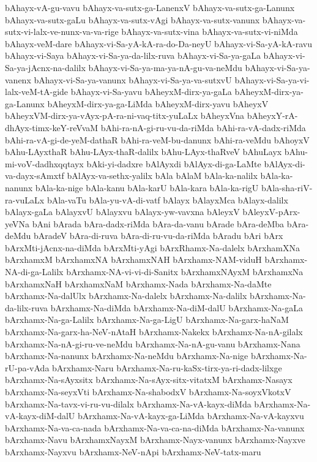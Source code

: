 {bAhayx-vA-gu-vavu
bAhayx-va-sutx-ga-LanenxV
bAhayx-va-sutx-ga-Lanunx
bAhayx-va-sutx-gaLu
bAhayx-va-sutx-vAgi
bAhayx-va-sutx-vanunx
bAhayx-va-sutx-vi-lalx-ve-nunx-va-va-rige
bAhayx-va-sutx-vina
bAhayx-va-sutx-vi-niMda
bAhayx-veM-dare
bAhayx-vi-Sa-yA-kA-ra-do-Da-neyU
bAhayx-vi-Sa-yA-kA-ravu
bAhayx-vi-Saya
bAhayx-vi-Sa-ya-da-lilx-ruva
bAhayx-vi-Sa-ya-gaLa
bAhayx-vi-Sa-ya-jAcnx-na-dalilx
bAhayx-vi-Sa-ya-ma-ya-nA-gu-va-neMdu
bAhayx-vi-Sa-ya-vanenx
bAhayx-vi-Sa-ya-vanunx
bAhayx-vi-Sa-ya-va-sutxvU
bAhayx-vi-Sa-ya-vi-lalx-veM-tA-gide
bAhayx-vi-Sa-yavu
bAheyxM-dirx-ya-gaLa
bAheyxM-dirx-ya-ga-Lanunx
bAheyxM-dirx-ya-ga-LiMda
bAheyxM-dirx-yavu
bAheyxV
bAheyxVM-dirx-ya-vAyx-pA-ra-ni-vaq-titx-yuLaLx
bAheyxVna
bAheyxY-rA-dhAyx-timx-keY-reVvaM
bAhi-ra-nA-gi-ru-vu-da-riMda
bAhi-ra-vA-dadx-riMda
bAhi-ra-vA-gi-de-yeM-dathaR
bAhi-ra-veM-bu-danunx
bAhi-ra-veMdu
bAhoyxV
bAhu-LAyxthaR
bAhu-LAyx-thaR-dalilx
bAhu-LAyx-thaRveV
bAhuLayx
bAhu-mi-voV-dadhxqqtayx
bAki-yi-dadxre
bAlAyxdi
bAlAyx-di-ga-LaMte
bAlAyx-di-va-dayx-sAmxtf
bAlAyx-va-sethx-yalilx
bAla
bAlaM
bAla-ka-nalilx
bAla-ka-nanunx
bAla-ka-nige
bAla-kanu
bAla-karU
bAla-kara
bAla-ka-rigU
bAla-sha-riV-ra-vuLaLx
bAla-vaTu
bAla-yu-vA-di-vatf
bAlayx
bAlayxMca
bAlayx-dalilx
bAlayx-gaLa
bAlayxvU
bAlayxvu
bAlayx-yw-vavxna
bAleyxV
bAleyxV-pArx-yeVNa
bAni
bArada
bAra-dadx-riMda
bAra-da-vanu
bArade
bAra-deMba
bAra-deMdu
bAradeV
bAra-di-ruva
bAra-di-ru-vu-da-riMda
bAradu
bAri
bArx
bArxMti-jAcnx-na-diMda
bArxMti-yAgi
bArxRhamx-Na-dalelx
bArxhamXNa
bArxhamxM
bArxhamxNA
bArxhamxNAH
bArxhamx-NAM-viduH
bArxhamx-NA-di-ga-Lalilx
bArxhamx-NA-vi-vi-di-Sanitx
bArxhamxNAyxM
bArxhamxNa
bArxhamxNaH
bArxhamxNaM
bArxhamx-Nada
bArxhamx-Na-daMte
bArxhamx-Na-dalUlx
bArxhamx-Na-dalelx
bArxhamx-Na-dalilx
bArxhamx-Na-da-lilx-ruva
bArxhamx-Na-diMda
bArxhamx-Na-diM-dalU
bArxhamx-Na-gaLa
bArxhamx-Na-ga-Lalilx
bArxhamx-Na-ga-LigU
bArxhamx-Na-garx-haNaM
bArxhamx-Na-garx-ha-NeV-nAtaH
bArxhamx-Nakekx
bArxhamx-Na-nA-gilalx
bArxhamx-Na-nA-gi-ru-ve-neMdu
bArxhamx-Na-nA-gu-vanu
bArxhamx-Nana
bArxhamx-Na-nanunx
bArxhamx-Na-neMdu
bArxhamx-Na-nige
bArxhamx-Na-rU-pa-vAda
bArxhamx-Naru
bArxhamx-Na-ru-kaSx-tirx-ya-ri-dadx-lilxge
bArxhamx-Na-sAyxsitx
bArxhamx-Na-sAyx-sitx-vitatxM
bArxhamx-Nasayx
bArxhamx-Na-seyxVti
bArxhamx-Na-shabodxV
bArxhamx-Na-soyxVkotxV
bArxhamx-Na-tavx-vi-ru-vu-dilalx
bArxhamx-Na-vA-kayx-diMda
bArxhamx-Na-vA-kayx-diM-dalU
bArxhamx-Na-vA-kayx-ga-LiMda
bArxhamx-Na-vA-kayxvu
bArxhamx-Na-va-ca-nada
bArxhamx-Na-va-ca-na-diMda
bArxhamx-Na-vanunx
bArxhamx-Navu
bArxhamxNayxM
bArxhamx-Nayx-vanunx
bArxhamx-Nayxve
bArxhamx-Nayxvu
bArxhamx-NeV-nApi
bArxhamx-NeV-tatx-maru
}
